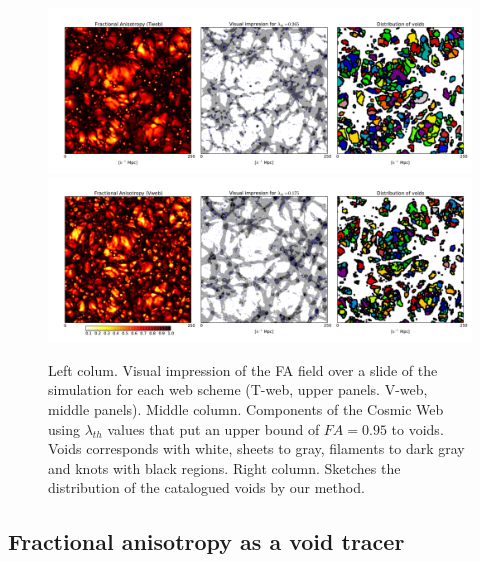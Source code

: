 \documentclass[a4,useAMS,usenatbib,usegraphicx]{latex/mn2e}
\begin{document}
\begin{figure}
  \includegraphics[trim = 16mm 8mm 5mm 12mm, clip, keepaspectratio=true,
  width=0.73\textheight]{./figures/cosmicweb_FA_Tweb.pdf}
  \includegraphics[trim = 16mm 8mm 5mm 12mm, clip, keepaspectratio=true,
  width=0.73\textheight]{./figures/cosmicweb_FA_Vweb.pdf}
  \caption{Left colum. Visual impression of the 
  FA field over a slide of the simulation for each web scheme (T-web, upper 
  panels. V-web, middle panels). 
  Middle column. Components of the Cosmic Web using $\lambda_{th}$
  values that put an upper bound of $FA=0.95$ to voids. Voids
  corresponds with white, sheets to gray, filaments to dark gray and
  knots with black regions. 
  Right column. Sketches the distribution of the catalogued voids by
  our method.}
  \label{fig:FA_field}
\end{figure}


\subsection{Fractional anisotropy as a void tracer}
\label{subsec:web_voids}
\end{document}

